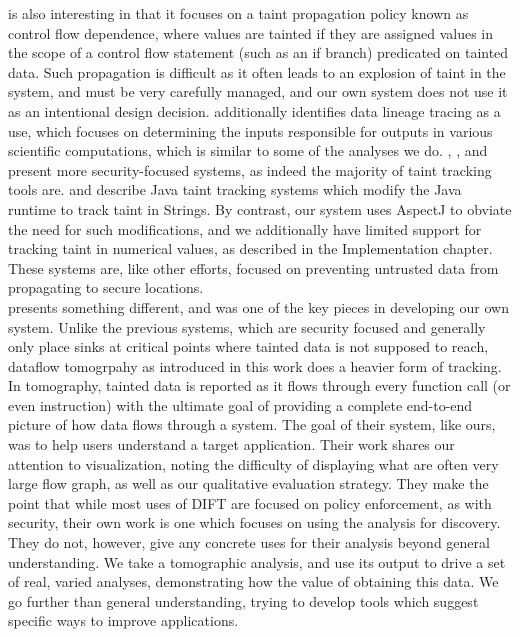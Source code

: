 \documentclass[msc,oneside]{ubcthesis}
\begin{document}
	\cite{Al-Saleh2010a} is also interesting in that it focuses on a taint propagation policy known as control flow dependence, where values are tainted if they are assigned values in the scope of a control flow statement (such as an if branch) predicated on tainted data. Such propagation is difficult as it often leads to an explosion of taint in the system, and must be very carefully managed, and our own system does not use it as an intentional design decision. \cite{Gupta2008} additionally identifies data lineage tracing as a use, which focuses on determining the inputs responsible for outputs in various scientific computations, which is similar to some of the analyses we do. \cite{Dalton2010}, \cite{Zavou2011}, and \cite{Kangkook2012} present more security-focused systems, as indeed the majority of taint tracking tools are. \cite{Haldar2005} and \cite{Chin2009} describe Java taint tracking systems which modify the Java runtime to track taint in Strings. By contrast, our system uses AspectJ to obviate the need for such modifications, and we additionally have limited support for tracking taint in numerical values, as described in the Implementation chapter. These systems are, like other efforts, focused on preventing untrusted data from propagating to secure locations.\\
	
	\cite{Mysore2008} presents something different, and was one of the key pieces in developing our own system. Unlike the previous systems, which are security focused and generally only place sinks at critical points where tainted data is not supposed to reach, dataflow tomogrpahy as introduced in this work does a heavier form of tracking. In tomography, tainted data is reported as it flows through every function call (or even instruction) with the ultimate goal of providing a complete end-to-end picture of how data flows through a system. The goal of their system, like ours, was to help users understand a target application. Their work shares our attention to visualization, noting the difficulty of displaying what are often very large flow graph, as well as our qualitative evaluation strategy. They make the point that while most uses of DIFT are focused on policy enforcement, as with security, their own work is one which focuses on using the analysis for discovery. They do not, however, give any concrete uses for their analysis beyond general understanding. We take a tomographic analysis, and use its output to drive a set of real, varied analyses, demonstrating how the value of obtaining this data. We go further than general understanding, trying to develop tools which suggest specific ways to improve applications.
	
\end{document}
